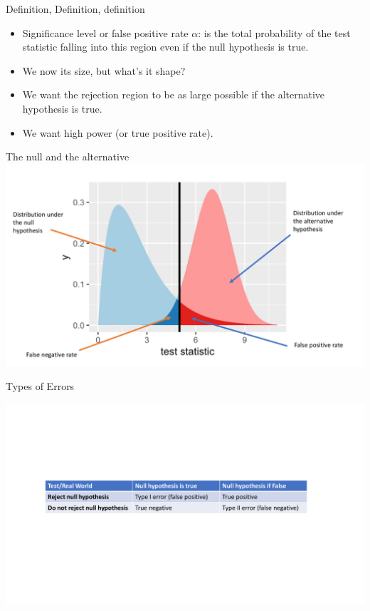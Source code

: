 \documentclass{bredelebeamer}
\begin{document}
\begin{frame}
\begin{block}{Definition, Definition, definition}
	
	\begin{itemize}
		\item Significance level or false positive rate $\alpha$: is the total probability of the test statistic falling into this region even if the null hypothesis is true.
		
		\item We now its size, but what's it shape?
		
		\item  We want the rejection region to be as large possible if the alternative hypothesis is true.
		
		\item We want high power (or true positive rate).
	\end{itemize}
	
\end{block}

\end{frame}

\begin{frame}{The null and the alternative}
\includegraphics[width=1\textwidth]{nullalt}
\end{frame}

\begin{frame}{Types of Errors}

\includegraphics[width=1.2\textwidth]{typeerrors}

\end{frame}
\end{document}
